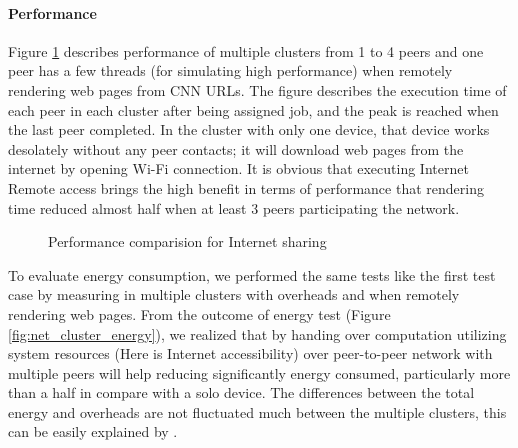 \documentclass[conference]{IEEEtran}
\begin{document}
\paragraph{Performance}
Figure \ref{fig:net_clusters_perf} describes performance of multiple clusters from 1 to 4 peers and one peer has a few threads (for simulating high performance) when remotely rendering web pages from CNN URLs. The figure describes the execution time of each peer in each cluster after being assigned job, and the peak is reached when the last peer completed. In the cluster with only one device, that device works desolately without any peer contacts; it will download web pages from the internet by opening Wi-Fi connection. It is obvious that executing Internet Remote access brings the high benefit in terms of performance that rendering time reduced almost half when at least 3 peers participating the network. 

\begin{figure}[H]
	\centering
	\caption{Performance comparision for Internet sharing}
	\label{fig:net_clusters_perf}
	\vspace{-2mm}
\end{figure}

To evaluate energy consumption, we performed the same tests like the first test case by measuring in multiple clusters with overheads and when remotely rendering web pages. From the outcome of energy test (Figure \ref{fig:net_cluster_energy}), we realized that by handing over computation utilizing system resources (Here is Internet accessibility) over peer-to-peer network with multiple peers will help reducing significantly energy consumed, particularly more than a half in compare with a solo device. The differences between the total energy and overheads are not fluctuated much between the multiple clusters, this can be easily explained by \cite{wifi_energy}.
\end{document}
